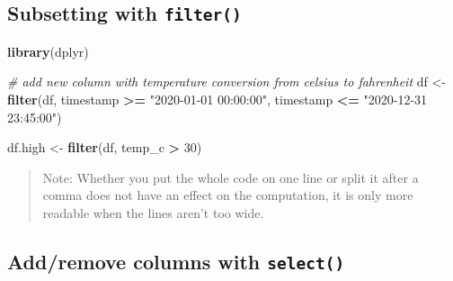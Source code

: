 \documentclass[
  a4paperpaper,
]{book}
\newenvironment{Shaded}{\begin{snugshade}}{\end{snugshade}}
\newcommand{\CommentTok}[1]{\textcolor[rgb]{0.56,0.35,0.01}{\textit{#1}}}
\newcommand{\DataTypeTok}[1]{\textcolor[rgb]{0.13,0.29,0.53}{#1}}
\newcommand{\DecValTok}[1]{\textcolor[rgb]{0.00,0.00,0.81}{#1}}
\newcommand{\FloatTok}[1]{\textcolor[rgb]{0.00,0.00,0.81}{#1}}
\newcommand{\KeywordTok}[1]{\textcolor[rgb]{0.13,0.29,0.53}{\textbf{#1}}}
\newcommand{\NormalTok}[1]{#1}
\newcommand{\OperatorTok}[1]{\textcolor[rgb]{0.81,0.36,0.00}{\textbf{#1}}}
\newcommand{\StringTok}[1]{\textcolor[rgb]{0.31,0.60,0.02}{#1}}
\let\oldShaded\Shaded
\let\endoldShaded\endShaded
\renewenvironment{Shaded}{\footnotesize\oldShaded}{\endoldShaded}
\begin{document}
\hypertarget{subsetting-with-filter}{%
\subsection{\texorpdfstring{Subsetting with \texttt{filter()}}{Subsetting with filter()}}\label{subsetting-with-filter}}

\begin{Shaded}
\begin{Highlighting}[]
\KeywordTok{library}\NormalTok{(dplyr)}

\CommentTok{# add new column with temperature conversion from celsius to fahrenheit}
\NormalTok{df <-}\StringTok{ }\KeywordTok{filter}\NormalTok{(df,}
\NormalTok{             timestamp }\OperatorTok{>=}\StringTok{ "2020-01-01 00:00:00"}\NormalTok{,}
\NormalTok{             timestamp }\OperatorTok{<=}\StringTok{ "2020-12-31 23:45:00"}\NormalTok{)}

\NormalTok{df.high <-}\StringTok{ }\KeywordTok{filter}\NormalTok{(df, temp_c }\OperatorTok{>}\StringTok{ }\DecValTok{30}\NormalTok{)}
\end{Highlighting}
\end{Shaded}

\begin{quote}
Note: Whether you put the whole code on one line or split it after a comma does not have an effect on the computation, it is only more readable when the lines aren't too wide.
\end{quote}

\newpage

\hypertarget{addremove-columns-with-select}{%
\subsection{\texorpdfstring{Add/remove columns with \texttt{select()}}{Add/remove columns with select()}}\label{addremove-columns-with-select}}

\begin{Shaded}
\end{Shaded}
\end{document}
